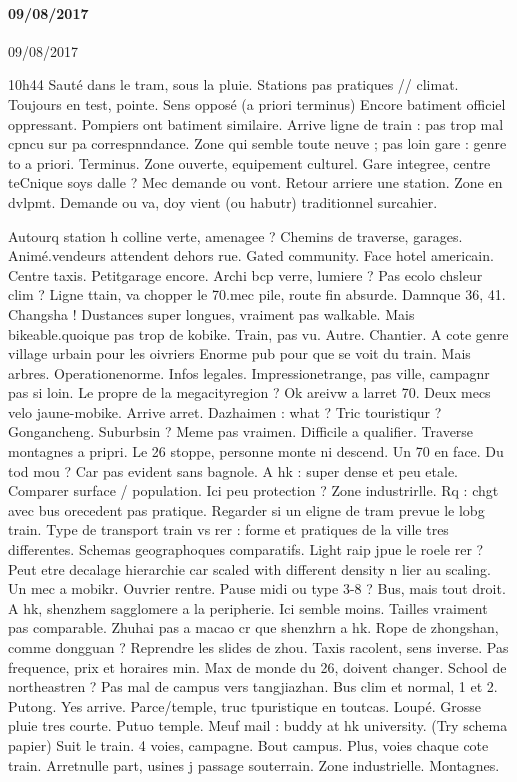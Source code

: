 \paragraph{09/08/2017}{09/08/2017}

10h44
Sauté dans le tram, sous la pluie.
Stations pas pratiques // climat.
Toujours en test, pointe.
Sens opposé (a priori terminus)
Encore batiment officiel oppressant. Pompiers ont batiment similaire.
Arrive ligne de train : pas trop mal cpncu sur pa correspnndance. Zone qui semble toute neuve ; pas loin gare : genre to a priori. Terminus. Zone ouverte, equipement culturel. Gare integree, centre teCnique soys dalle ? Mec demande ou vont. Retour arriere une station.
Zone en dvlpmt. Demande ou va, doy vient (ou habutr) traditionnel surcahier.

Autourq station h colline verte, amenagee ?
Chemins de traverse, garages. Animé.vendeurs attendent dehors rue.
Gated community. Face hotel americain.
Centre taxis. Petitgarage encore. Archi bcp verre, lumiere ? Pas ecolo chsleur clim ?
Ligne ttain, va chopper le 70.mec pile, route fin absurde.
Damnque 36, 41. Changsha !
Dustances super longues, vraiment pas walkable. Mais bikeable.quoique pas trop de kobike. Train, pas vu. Autre.
Chantier. A cote genre village urbain pour les oivriers
Enorme pub pour que se voit du train. Mais arbres.
Operationenorme. Infos legales.
Impressionetrange, pas ville, campagnr pas si loin. Le propre de la megacityregion ?
Ok areivw a larret 70.
Deux mecs velo jaune-mobike.
Arrive arret. Dazhaimen : what ? Tric touristiqur ?
Gongancheng.
Suburbsin ? Meme pas vraimen. Difficile a qualifier.
Traverse montagnes a pripri. Le 26 stoppe, personne monte ni descend. Un 70 en face.
Du tod mou ? Car pas evident sans bagnole. A hk : super dense et peu etale. Comparer surface / population. Ici peu protection ?
Zone industrirlle. Rq : chgt avec bus orecedent pas pratique. Regarder si un eligne de tram prevue le lobg train. Type de transport train vs rer : forme et pratiques de la ville tres differentes. Schemas geographoques comparatifs. Light raip jpue le roele rer ? Peut etre decalage hierarchie car scaled with different density n lier au scaling.
Un mec a mobikr. Ouvrier rentre. Pause midi ou type 3-8 ? Bus, mais tout droit.
A hk, shenzhem sagglomere a la peripherie. Ici semble moins. Tailles vraiment pas comparable. Zhuhai pas a macao cr que shenzhrn a hk. Rope de zhongshan, comme dongguan ? Reprendre les slides de zhou.
Taxis racolent, sens inverse.
Pas frequence, prix et horaires min. Max de monde du 26, doivent changer. School de northeastren ? Pas mal de campus vers tangjiazhan. Bus clim et normal, 1 et 2.
Putong. Yes arrive.
Parce/temple, truc tpuristique en toutcas. Loupé.
Grosse pluie tres courte.
Putuo temple.
Meuf mail : buddy at hk university.
(Try schema papier)
Suit le train. 4 voies, campagne. Bout campus. Plus, voies chaque cote train.
Arretnulle part, usines j passage souterrain. Zone industrielle. Montagnes.


